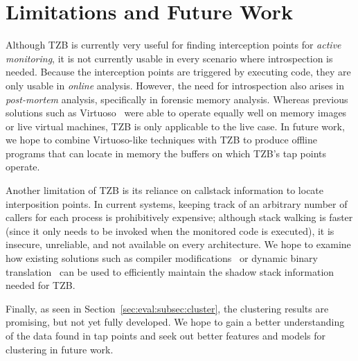 \section{Limitations and Future Work}
\label{sec:limitations}

Although TZB is currently very useful for finding interception points
for \emph{active monitoring}, it is not currently usable in every
scenario where introspection is needed. Because the interception points
are triggered by executing code, they are only usable in \emph{online}
analysis. However, the need for introspection also arises in
\emph{post-mortem} analysis, specifically in forensic memory analysis.
Whereas previous solutions such as Virtuoso~\cite{Dolan-Gavitt:2011uq}
were able to operate equally well on memory images or live virtual
machines, TZB is only applicable to the live case. In future work, we
hope to combine Virtuoso-like techniques with TZB to produce offline
programs that can locate in memory the buffers on which TZB's tap points
operate.

Another limitation of TZB is its reliance on callstack information to
locate interposition points. In current systems, keeping track of an
arbitrary number of callers for each process is prohibitively expensive;
although stack walking is faster (since it only needs to be invoked when
the monitored code is executed), it is insecure, unreliable, and not
available on every architecture. We hope to examine how existing
solutions such as compiler modifications~\cite{stackshield,Chiueh:2001ys}
or dynamic binary translation~\cite{Sinnadurai:2008vn} can be used to
efficiently maintain the shadow stack information needed for TZB.

Finally, as seen in Section~\ref{sec:eval:subsec:cluster}, the
clustering results are promising, but not yet fully developed. We hope
to gain a better understanding of the data found in tap points and seek
out better features and models for clustering in future work.
